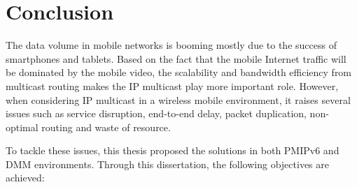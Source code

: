 \section{Conclusion}
The data volume in mobile networks is booming mostly due to the success of smartphones and tablets. Based on the fact that the mobile Internet traffic will be dominated by the mobile video, the scalability and bandwidth efficiency from multicast routing makes the IP multicast play more important role. However, when considering IP multicast in a wireless mobile environment, it raises several issues such as service disruption, end-to-end delay, packet duplication, non-optimal routing and waste of resource.

To tackle these issues, this thesis proposed the solutions in both PMIPv6 and DMM environments. Through this dissertation, the following objectives are achieved:
